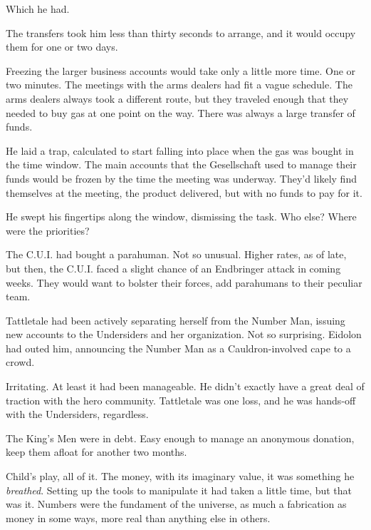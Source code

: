Which he had.



The transfers took him less than thirty seconds to arrange, and it would occupy them for one or two days.



Freezing the larger business accounts would take only a little more time.  One or two minutes.  The meetings with the arms dealers had fit a vague schedule.  The arms dealers always took a different route, but they traveled enough that they needed to buy gas at one point on the way.  There was always a large transfer of funds.



He laid a trap, calculated to start falling into place when the gas was bought in the time window.  The main accounts that the Gesellschaft used to manage their funds would be frozen by the time the meeting was underway.  They'd likely find themselves at the meeting, the product delivered, but with no funds to pay for it.



He swept his fingertips along the window, dismissing the task.  Who else?  Where were the priorities?



The C.U.I. had bought a parahuman.  Not so unusual.  Higher rates, as of late, but then, the C.U.I. faced a slight chance of an Endbringer attack in coming weeks.  They would want to bolster their forces, add parahumans to their peculiar team.



Tattletale had been actively separating herself from the Number Man, issuing new accounts to the Undersiders and her organization.  Not so surprising.  Eidolon had outed him, announcing the Number Man as a Cauldron-involved cape to a crowd.



Irritating.  At least it had been manageable.  He didn't exactly have a great deal of traction with the hero community.  Tattletale was one loss, and he was hands-off with the Undersiders, regardless.



The King's Men were in debt.  Easy enough to manage an anonymous donation, keep them afloat for another two months.



Child's play, all of it.  The money, with its imaginary value, it was something he \emph{breathed}.  Setting up the tools to manipulate it had taken a little time, but that was it.  Numbers were the fundament of the universe, as much a fabrication as money in some ways, more real than anything else in others.



